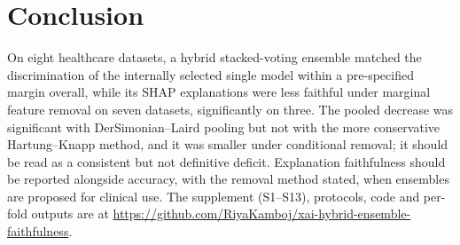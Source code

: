 \section{Conclusion}
On eight healthcare datasets, a hybrid stacked-voting ensemble matched the discrimination of the internally selected single model within a pre-specified margin overall, while its SHAP explanations were less faithful under marginal feature removal on seven datasets, significantly on three. The pooled decrease was significant with DerSimonian--Laird pooling but not with the more conservative Hartung--Knapp method, and it was smaller under conditional removal; it should be read as a consistent but not definitive deficit. Explanation faithfulness should be reported alongside accuracy, with the removal method stated, when ensembles are proposed for clinical use. The supplement (S1--S13), protocols, code and per-fold outputs are at \url{https://github.com/RiyaKamboj/xai-hybrid-ensemble-faithfulness}.
